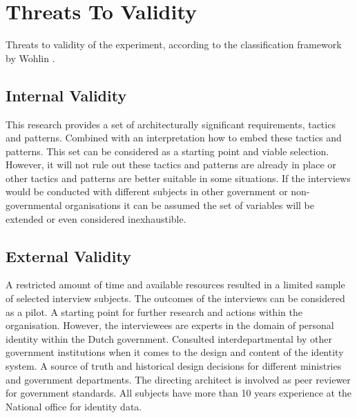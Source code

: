 \chapter{Threats To Validity}\label{sec:threats}
Threats to validity of the experiment, according to the classification framework by Wohlin \etal \cite{wohlin12}.

\section{Internal Validity}
This research provides a set of architecturally significant requirements, tactics and patterns. Combined with an interpretation how to embed these tactics and patterns.
This set can be considered as a starting point and viable selection. However, it will not rule out these tactics and patterns are already in place or other tactics and patterns are better suitable in some situations. If the interviews would be conducted with different subjects in other government or non-governmental organisations it can be assumed the set of variables will be extended or even considered inexhaustible.

\section{External Validity}
A restricted amount of time and available resources resulted in a limited sample of selected interview subjects. The outcomes of the interviews can be considered as a pilot. A starting point for further research and actions within the organisation. 
However, the interviewees are experts in the domain of personal identity within the Dutch government. Consulted interdepartmental by other government institutions when it comes to the design and content of the identity system. A source of truth and historical design decisions for different ministries and government departments. The directing architect is involved as peer reviewer for government standards. All subjects have more than 10 years experience at the National office for identity data.  

